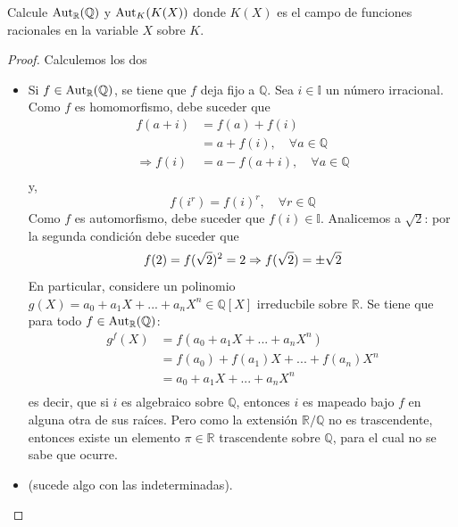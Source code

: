 \documentclass[12pt]{report}
\theoremstyle{largebreak}
\newcommand\aut{\textup{Aut}}
\begin{document}
\begin{excer}
    Calcule $\aut_{\mathbb{R}}(\mathbb{Q})$ y $\aut_{K}(K(X))$ donde $K(X)$ es el campo de funciones racionales en la variable $X$ sobre $K$.
\end{excer}

\begin{proof}
    Calculemos los dos
    \begin{itemize}
        \item Si $f\in \aut_{\mathbb{R}}(\mathbb{Q})$, se tiene que $f$ deja fijo a $\mathbb{Q}$. Sea $i\in\mathbb{I}$ un número irracional. Como $f$ es homomorfismo, debe suceder que
        \begin{equation*}
            \begin{split}
                f(a+i)&=f(a)+f(i)\\
                &=a+f(i),\quad\forall a\in\mathbb{Q}\\
                \Rightarrow f(i)&=a-f(a+i),\quad\forall a\in\mathbb{Q}\\
            \end{split}
        \end{equation*}
        y,
        \begin{equation*}
            f(i^r)=f(i)^r,\quad\forall r\in\mathbb{Q}
        \end{equation*}
        Como $f$ es automorfismo, debe suceder que $f(i)\in\mathbb{I}$. Analicemos a $\sqrt{2}$: por la segunda condición debe suceder que
        \begin{equation*}
            f(2)=f(\sqrt{2})^2=2\Rightarrow f(\sqrt{2})=\pm \sqrt{2}\\
        \end{equation*}
        En particular, considere un polinomio $g(X)=a_0+a_1X+...+a_nX^n \in\mathbb{Q}[X]$ irreducbile sobre $\mathbb{R}$. Se tiene que para todo $f\in\aut_{\mathbb{R}}(\mathbb{Q})$:
        \begin{equation*}
            \begin{split}
                g^f(X)&=f(a_0+a_1X+...+a_nX^n)\\
                &=f(a_0)+f(a_1)X+...+f(a_n)X^n\\
                &=a_0+a_1X+...+a_nX^n\\
            \end{split}
        \end{equation*}
        es decir, que si $i$ es algebraico sobre $\mathbb{Q}$, entonces $i$ es mapeado bajo $f$ en alguna otra de sus raíces. Pero como la extensión $\mathbb{R}/\mathbb{Q}$ no es trascendente, entonces existe un elemento $\pi\in\mathbb{R}$ trascendente sobre $\mathbb{Q}$, para el cual no se sabe que ocurre.
        \item (sucede algo con las indeterminadas).
    \end{itemize}
\end{proof}
\end{document}
